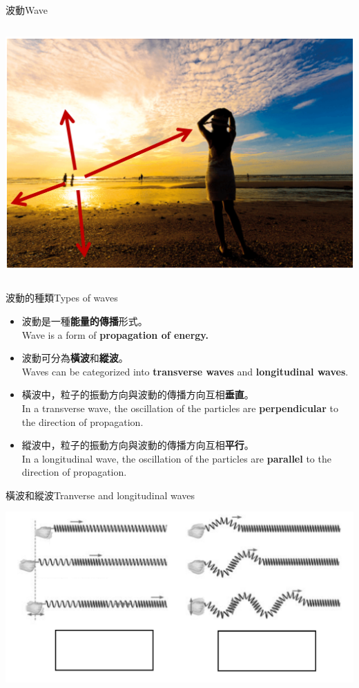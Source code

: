 \documentclass[beamer=true]{standalone}
\begin{document}
\begin{frame}{波動Wave}
\begin{columns}
        \par{\par\centering\includegraphics[width=.8\textwidth]{./img/ch1_2024-05-03-21-56-34.png}\par}
    \end{columns}
\end{frame}

\begin{frame}{波動的種類Types of waves}
    \begin{itemize}
        \item 波動是一種\textbf{能量的傳播}形式。\\Wave is a form of \textbf{propagation of energy.}
        \item 波動可分為\textbf{橫波}和\textbf{縱波}。\\Waves can be categorized into \textbf{transverse waves} and \textbf{longitudinal waves}.
        \item 橫波中，粒子的振動方向與波動的傳播方向互相\textbf{垂直}。\\In a transverse wave, the oscillation of the particles are \textbf{perpendicular} to the direction of propagation.
        \item 縱波中，粒子的振動方向與波動的傳播方向互相\textbf{平行}。\\In a longitudinal wave, the oscillation of the particles are \textbf{parallel} to the direction of propagation.
    \end{itemize}
\end{frame}

\begin{frame}{橫波和縱波Tranverse and longitudinal waves}
    \par{\par\centering\includegraphics[width=\textwidth]{./img/ch1_2024-05-06-17-27-20.png}\par}
\end{frame}
\end{document}
